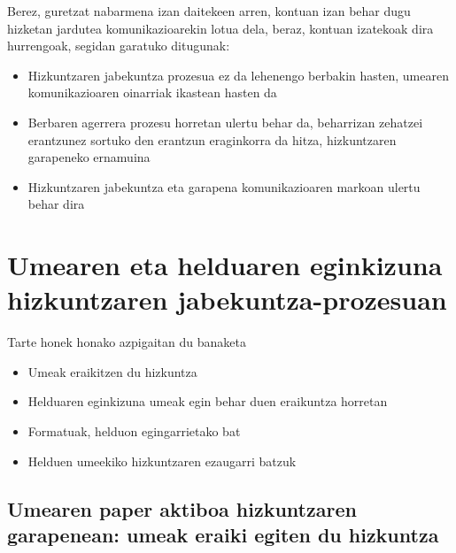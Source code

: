 \documentclass[
]{book}
\providecommand{\tightlist}{%
  \setlength{\itemsep}{0pt}\setlength{\parskip}{0pt}}
\begin{document}
Berez, guretzat nabarmena izan daitekeen arren, kontuan izan behar dugu hizketan jardutea komunikazioarekin lotua dela, beraz, kontuan izatekoak dira hurrengoak, segidan garatuko ditugunak:

\begin{itemize}
\tightlist
\item
  Hizkuntzaren jabekuntza prozesua ez da lehenengo berbakin hasten, umearen komunikazioaren oinarriak ikastean hasten da
\item
  Berbaren agerrera prozesu horretan ulertu behar da, beharrizan zehatzei erantzunez sortuko den erantzun eraginkorra da hitza, hizkuntzaren garapeneko ernamuina
\item
  Hizkuntzaren jabekuntza eta garapena komunikazioaren markoan ulertu behar dira
\end{itemize}

\hypertarget{umearen-eta-helduaren-eginkizuna-hizkuntzaren-jabekuntza-prozesuan}{%
\section{Umearen eta helduaren eginkizuna hizkuntzaren jabekuntza-prozesuan}\label{umearen-eta-helduaren-eginkizuna-hizkuntzaren-jabekuntza-prozesuan}}

Tarte honek honako azpigaitan du banaketa

\begin{itemize}
\tightlist
\item
  Umeak eraikitzen du hizkuntza
\item
  Helduaren eginkizuna umeak egin behar duen eraikuntza horretan
\item
  Formatuak, helduon egingarrietako bat
\item
  Helduen umeekiko hizkuntzaren ezaugarri batzuk
\end{itemize}

\hypertarget{umearen-paper-aktiboa-hizkuntzaren-garapenean-umeak-eraiki-egiten-du-hizkuntza}{%
\subsection{Umearen paper aktiboa hizkuntzaren garapenean: umeak eraiki egiten du hizkuntza}\label{umearen-paper-aktiboa-hizkuntzaren-garapenean-umeak-eraiki-egiten-du-hizkuntza}}
\end{document}
